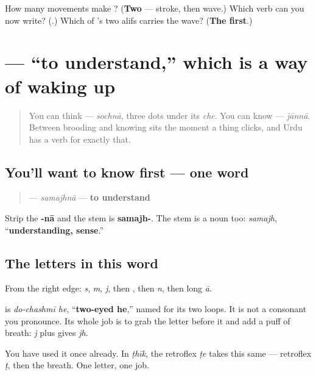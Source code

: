 \begin{tcolorbox}[breakable,colback=teal!4,colframe=teal!35!black,title={Before you move on}]
How many movements make \textbf{}? (\textbf{Two} — stroke, then wave.) Which verb can you now write? (\textbf{}.) Which of \textbf{}'s two alifs carries the wave? (\textbf{The first}.)
\end{tcolorbox}
\section[\texorpdfstring{\ur{سمجھنا} (samajhnā)}{سمجھنا (samajhnā)}]{ — “to understand,” which is a way of waking up}

\label{lesson:UR-C07-samajhna}



\begin{quote}
You can think — \emph{sochnā}, three dots under its \emph{che}. You can know — \emph{jānnā}. Between brooding and knowing sits the moment a thing clicks, and Urdu has a verb for exactly that.
\end{quote}

\subsection*{You'll want to know first — one word}
\begin{quote}
\textbf{} — \emph{samajhnā} — \textbf{to understand}
\end{quote}

Strip the \textbf{-nā} and the stem is \textbf{samajh-}. The stem is a noun too: \textbf{} \emph{samajh}, “\textbf{understanding, sense}.”

\subsection*{The letters in this word}
From the right edge: \textbf{} \emph{s}, \textbf{} \emph{m}, \textbf{} \emph{j}, then \textbf{}, then \textbf{} \emph{n}, then \textbf{} long \emph{ā}.

\textbf{} is \emph{do-chashmī he}, “\textbf{two-eyed he},” named for its two loops. It is not a consonant you pronounce. Its whole job is to grab the letter before it and add a puff of breath: \textbf{} \emph{j} plus \textbf{} gives \textbf{} \emph{jh}.

You have used it once already. In \emph{ṭhīk}, the retroflex \emph{ṭe} takes this same \textbf{} — retroflex \emph{ṭ}, then the breath. One letter, one job.

